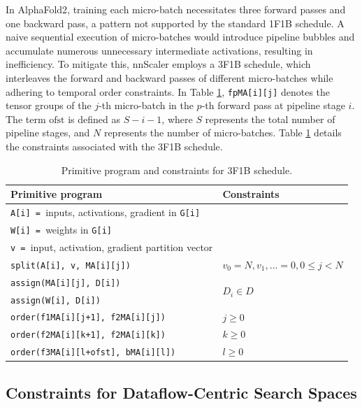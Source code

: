 In AlphaFold2\cite{jumper2021highly}, training each micro-batch necessitates three forward passes and one backward pass, a pattern not supported by the standard 1F1B schedule. A naive sequential execution of micro-batches would introduce pipeline bubbles and accumulate numerous unnecessary intermediate activations, resulting in inefficiency. To mitigate this, nnScaler employs a 3F1B schedule, which interleaves the forward and backward passes of different micro-batches while adhering to temporal order constraints. In Table \ref{tab:3f1b}, \texttt{fpMA[i][j]} denotes the tensor groups of the $j$-th micro-batch in the $p$-th forward pass at pipeline stage $i$. The term $\mathrm{ofst}$ is defined as $S - i - 1$, where $S$ represents the total number of pipeline stages, and $N$ represents the number of micro-batches. Table \ref{tab:3f1b} details the constraints associated with the 3F1B schedule.

\begin{table}[h]
  \centering
  \footnotesize
  \begin{tabular}{l|l}
  \textbf{Primitive program} & \textbf{Constraints} \\
  \hline
  \texttt{A[i] = }inputs, activations, gradient in \texttt{G[i]} & \\
  \texttt{W[i] = }weights in \texttt{G[i]} & \\
  \texttt{v = }input, activation, gradient partition vector & \\
  \hline
  \texttt{split(A[i], v, MA[i][j])} & $v_0 = N, v_1, ... = 0, 0 \leq j < N $ \\
  \texttt{assign(MA[i][j], D[i])} & \multirow{2}{*}{$D_i \in D$} \\
  \texttt{assign(W[i], D[i])} & \\
  \hline
  \texttt{order(f1MA[i][j+1], f2MA[i][j])} & $j \geq 0$ \\ 
  \texttt{order(f2MA[i][k+1], f2MA[i][k])} &  $k \geq 0$ \\
  \texttt{order(f3MA[i][l+ofst], bMA[i][l])} &  $l \geq 0$ \\
  \hline
  \end{tabular}
  \caption{Primitive program and constraints for 3F1B schedule.}
  \label{tab:3f1b}
\end{table}

\subsection{Constraints for Dataflow-Centric Search Spaces}
\label{sec:dataflow_constraints}

